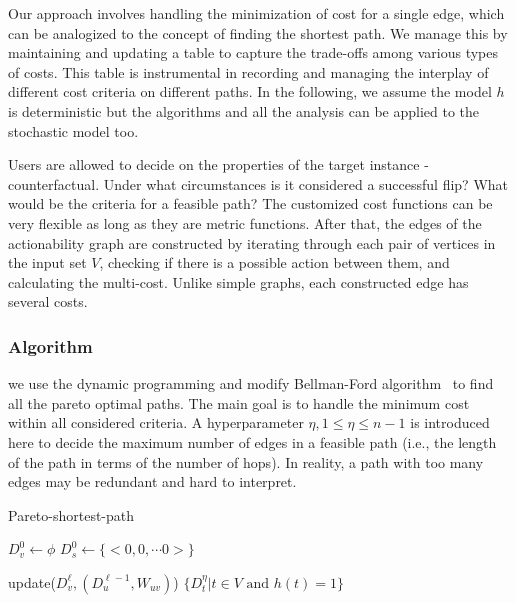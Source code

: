 Our approach involves handling the minimization of cost for a single edge, which can be analogized to the concept of finding the shortest path. We manage this by maintaining and updating a table to capture the trade-offs among various types of costs. This table is instrumental in recording and managing the interplay of different cost criteria on different paths. In the following, we assume the model $h$ is deterministic but the algorithms and all the analysis can be applied to the stochastic model too.

Users are allowed to decide on the properties of the target instance - counterfactual. Under what circumstances is it considered a successful flip? What would be the criteria for a feasible path? The customized cost functions can be very flexible as long as they are metric functions. After that, the edges of the actionability graph are constructed by iterating through each pair of vertices in the input set $V$, checking if there is a possible action between them, and calculating the multi-cost. Unlike simple graphs, each constructed edge has several costs.

\subsubsection{Algorithm} we use the dynamic programming and modify Bellman-Ford algorithm~\cite{bellman1958routing} to find all the pareto optimal paths. The main goal is to handle the minimum cost within all considered criteria. A hyperparameter $\eta, 1 \leq \eta \leq n-1$ is introduced here to decide the maximum number of edges in a feasible path (i.e., the length of the path in terms of the number of hops). In reality, a path with too many edges may be redundant and hard to interpret. 

\begin{algorithm}
\caption{Pareto-shortest-path}
\label{algo:pareto-shortest}
\begin{algorithmic}[1]
            \State $D^0_v \gets \phi$ 
        \EndFor
        \State$D^0_{s} \gets \{ <0,0,\cdots 0> \}$     
          
                \State update($D^\ell_v, (D^{\ell-1}_u, W_{uv})$) %
            \EndFor
        \EndFor
        \State \Return $\{D^\eta_t| t\in V \text{ and } h(t)=1\}$
    \EndFunction
\end{algorithmic}
\end{algorithm}

